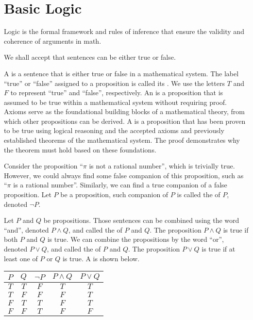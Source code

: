 \documentclass[10pt]{article}
\begin{document}
\section{Basic Logic}
Logic is the formal framework and rules of inference that ensure the validity and coherence of arguments in math. 
\begin{remark}
    We shall accept that sentences can be either true or false.
\end{remark} 
\par
A  is a sentence that is either true or false in a mathematical system. The label ``true'' or ``false'' assigned to a proposition is called its . We use the letters $T$ and $F$ to represent ``true'' and ``false'', respectively. An  is a proposition that is assumed to be true within a mathematical system without requiring proof. Axioms serve as the foundational building blocks of a mathematical theory, from which other propositions can be derived. A  is a proposition that has been proven to be true using logical reasoning and the accepted axioms and previously established theorems of the mathematical system. The proof demonstrates why the theorem must hold based on these foundations.
\par
Consider the proposition ``$\pi$ is not a rational number'', which is trivially true. However, we could always find some false companion of this proposition, such as ``$\pi$ is a rational number''. Similarly, we can find a true companion of a false proposition. Let $P$ be a proposition, such companion of $P$ is called the  of $P$, denoted $\neg P$.
\par
Let $P$ and $Q$ be propositions. Those sentences can be combined using the word ``and'', denoted $P\wedge Q$, and called the  of $P$ and $Q$. The proposition $P\wedge Q$ is true if both $P$ and $Q$ is true. We can combine the propositions by the word ``or'', denoted $P\vee Q$, and called the  of $P$ and $Q$. The proposition $P\vee Q$ is true if at least one of $P$ or $Q$ is true. A  is shown below.
\begin{center}
    \begin{tabular}{cc|ccc}
        $P$ & $Q$ & $\neg P$ & $P\wedge Q$ & $P\vee Q$ \\
        \hline
        $T$ & $T$ & $F$ & $T$ & $T$ \\
        $T$ & $F$ & $F$ & $F$ & $T$ \\
        $F$ & $T$ & $T$ & $F$ & $T$ \\
        $F$ & $F$ & $T$ & $F$ & $F$ \\
    \end{tabular}
\end{center}
\end{document}
